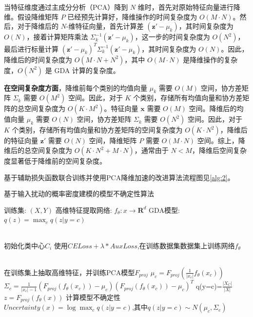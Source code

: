 当特征维度通过主成分分析（PCA）降到 \( N \) 维时，首先对原始特征向量进行降维。假设降维矩阵 \( P \) 已经预先计算好，降维操作的时间复杂度为 \( O(M \cdot N) \)。然后，对于降维后的 \( N \)-维特征向量，首先计算差 \( (\mathbf{z'} - \mu_k) \)，其时间复杂度为 \( O(N) \)，接着计算矩阵乘法 \( \Sigma_k^{-1} (\mathbf{z'} - \mu_k) \)，这一步的时间复杂度为 \( O(N^2) \)，最后进行标量计算 \( (\mathbf{z'} - \mu_k)^T \Sigma_k^{-1} (\mathbf{z'} - \mu_k) \)，其时间复杂度为 \( O(N) \)。因此，降维后的时间复杂度为 \( O(M \cdot N + N^2) \)，其中 \( O(M \cdot N) \) 是降维操作的复杂度，\( O(N^2) \) 是 GDA 计算的复杂度。

\textbf{在空间复杂度方面}，降维前每个类别的均值向量 \( \mu_k \) 需要 \( O(M) \) 空间，协方差矩阵 \( \Sigma_k \) 需要 \( O(M^2) \) 空间。因此，对于 \( K \) 个类别，存储所有均值向量和协方差矩阵的总空间复杂度为 \( O(K \cdot M^2) \)。特征向量 \( \mathbf{x} \) 需要 \( O(M) \) 空间。降维后的均值向量 \( \mu_k \) 需要 \( O(N) \) 空间，协方差矩阵 \( \Sigma_k \) 需要 \( O(N^2) \) 空间。因此，对于 \( K \) 个类别，存储所有均值向量和协方差矩阵的空间复杂度为 \( O(K \cdot N^2) \)，降维后的特征向量 \( \mathbf{z'} \) 需要 \( O(N) \) 空间，降维矩阵 \( P \) 需要 \( O(M \cdot N) \) 空间。综上，降维后的总空间复杂度为 \( O(K \cdot N^2 + M \cdot N) \)，通常由于 \( N < M \)，降维后空间复杂度显著低于降维前的空间复杂度。




基于辅助损失函数联合训练并使用PCA降维加速的改进算法流程图见\ref{alg:2}。


\begin{algorithm}[h]
	\caption{基于输入扰动的概率密度建模的模型不确定性算法}
	\label{alg:2}
	
	\begin{algorithmic}[1]
		\Require 训练集: $(X,Y)$ 
		\Require 高维特征提取网络: $f_{\theta}:x \rightarrow \mathbf{R}^d $ 
		\Require GDA模型: $q(z) = \max_{c}q(z|y=c)$
		
		\\
            \State 初始化类中心$C_i$
		\State 使用$CELoss+\lambda*AuxLoss$,在训练数据集数据集上训练网络$f_{\theta}$


		\EndProcedure
            \\
        
		\State 在训练集上抽取高维特征，并训练PCA模型$F_{proj}$
		\State $\mu_{c}=F_{proj}(\frac{1}{|x_c|}f_{\theta}(x_c))$
		\State $\Sigma_c = \frac{1}{|x_c|-1}(F_{proj}(f_{\theta}(x_c))-\mu_c)(F_{proj}(f_{\theta}(x_c))-      \mu_c)^T$
		\State q(y=c)=$\frac{|X_C|}{|X|}$
            \EndFor
		\EndProcedure 
            \\

        
		\State $z=F_{proj}(f_{\theta}(x))$
		\State 计算模型不确定性 $Uncertainty(x) = \log \max_{c}q(z|y=c)$,其中$q(z|y=c)\sim N(\mu_c,\Sigma_c)$
		\EndProcedure 
	\end{algorithmic}
\end{algorithm}



